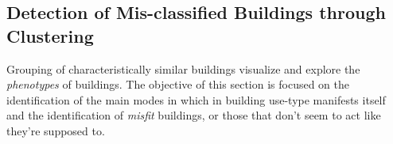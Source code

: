 \subsection{Detection of Mis-classified Buildings through Clustering}
\label{sec:clustering}

Grouping of characteristically similar buildings visualize and explore the \emph{phenotypes} of buildings. The objective of this section is focused on the identification of the main modes in which in building use-type manifests itself and the identification of \emph{misfit} buildings, or those that don't seem to act like they're supposed to.